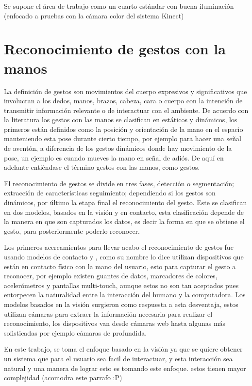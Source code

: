 Se supone el área de trabajo como un cuarto estándar con buena iluminación (enfocado a pruebas con la cámara color del sistema Kinect)

\section{Reconocimiento de gestos con la manos}\label{ReconocimientoGestos} 


La definición de gestos \citep{Mitra2007} son movimientos del cuerpo expresivos y significativos que involucran a los dedos, manos, brazos, cabeza, cara o cuerpo con la intención de transmitir información relevante o de interactuar con el ambiente. De acuerdo con la literatura \citep{Mitra2007} los gestos con las manos se clasifican en estáticos y dinámicos, los primeros están definidos como la posición y orientación de la mano en el espacio manteniendo esta pose durante cierto tiempo, por ejemplo para hacer una se\~nal de aventón, a diferencia de los gestos dinámicos donde hay movimiento de la pose, un ejemplo  es cuando mueves la mano en se\~nal de adiós. De aquí en adelante entiéndase el término gestos con las manos, como gestos. 

El reconocimiento de gestos se divide en tres fases\cite{Rautaray2012}, detección o segmentación; extracci\'on de caracter\'isticas seguimiento; dependiendo si los gestos son dinámicos, por último la etapa final el reconocimiento del gesto.  
Este se clasifican en dos modelos, basados en la visi\'on y en contacto, esta clasificaci\'on depende de la manera en que son capturados los datos, es decir la forma en que se obtiene el gesto, para posteriormente poderlo reconocer. 

Los primeros acercamientos para llevar acabo el reconocimiento de gestos fue usando modelos de contacto \cite{Rautaray2012} y \cite{Nayakwadi2014}, como su nombre lo dice utilizan dispositivos que est\'an en contacto f\'isico con la mano del usuario, esto para capturar el gesto a reconocer, por ejemplo existen guantes de datos, marcadores de colores, acelerómetros y pantallas multi-touch, aunque estos no son tan aceptados pues entorpecen la naturalidad entre la interacción del humano y la computadora. Los modelos basados en la visi\'on surgieron como respuesta a esta desventaja, estos utilizan cámaras para extraer la información necesaria para realizar el reconocimiento, los dispositivos van desde c\'amaras web hasta algunas más sofisticadas por ejemplo c\'amaras de profundida.  

En este trabajo, se toma el enfoque basado en la visi\'on ya que se quiere obtener un sistema que para el usuario sea facil de interactuar, y esta interacci\'on sea natural y una manera de lograr esto es tomando este enfoque.  estos tienen mayor complejidad (acomodra este parrafo :P)


